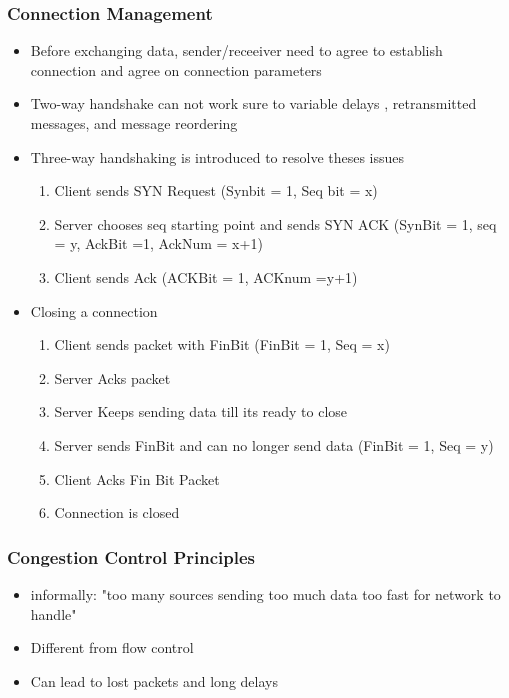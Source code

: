 \documentclass[twoside]{article}
\begin{document}
\subsubsection{Connection Management}
\begin{itemize}
\item Before exchanging data, sender/receeiver need to agree to establish connection and agree on connection parameters
\item Two-way handshake can not work sure to variable delays , retransmitted messages, and message reordering
\item Three-way handshaking is introduced to resolve theses issues
\begin{enumerate}
\item Client sends SYN Request (Synbit = 1, Seq bit = x) 
\item Server chooses seq starting point and sends SYN ACK  (SynBit = 1, seq = y, AckBit =1, AckNum = x+1)
\item Client sends Ack (ACKBit = 1, ACKnum =y+1)
\end{enumerate}
\item Closing a connection 
\begin{enumerate}
\item Client sends packet with FinBit (FinBit = 1, Seq = x)
\item Server Acks packet
\item Server Keeps sending data till its ready to close
\item Server sends FinBit and can no longer send data (FinBit = 1, Seq = y)
\item Client Acks Fin Bit Packet
\item Connection is closed
\end{enumerate}
\end{itemize}

\subsubsection{Congestion Control Principles}
\begin{itemize}
\item informally:  "too many sources sending too much data too fast for network to handle"
\item Different from flow control
\item Can lead to lost packets and long delays
\end{itemize}
\end{document}

